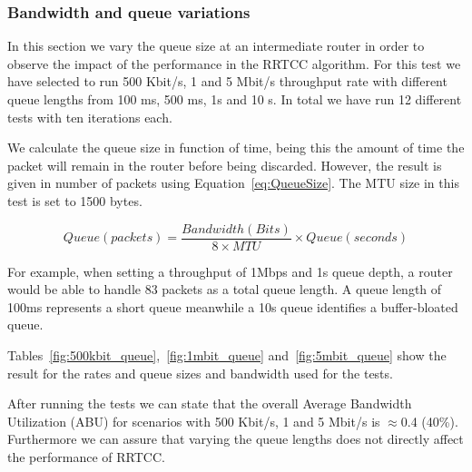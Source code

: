 \subsubsection{Bandwidth and queue variations}

In this section we vary the queue size at an intermediate router in order to observe the impact of the performance in the RRTCC algorithm. For this test we have selected to run 500 Kbit/s, 1 and 5 Mbit/s throughput rate with different queue lengths from 100 ms, 500 ms, 1s and 10 s. In total we have run 12 different tests with ten iterations each.

We calculate the queue size in function of time, being this the amount of time the packet will remain in the router before being discarded. However, the result is given in number of packets using Equation~\ref{eq:QueueSize}. The MTU size in this test is set to 1500 bytes.

\begin{equation}
	Queue (packets) = \frac{Bandwidth (Bits)}{8 \times MTU} \times Queue (seconds)
	\label{eq:QueueSize}
\end{equation}

For example, when setting a throughput of 1Mbps and 1s queue depth, a router would be able to handle 83 packets as a total queue length. A queue length of 100ms represents a short queue meanwhile a 10s queue identifies a buffer-bloated queue. 

Tables~\ref{fig:500kbit_queue},~\ref{fig:1mbit_queue} and~\ref{fig:5mbit_queue} show the result for the rates and queue sizes and bandwidth used for the tests.

After running the tests we can state that the overall Average Bandwidth Utilization (ABU)  for scenarios with 500 Kbit/s, 1 and 5 Mbit/s is $\approx$0.4 (40\%). Furthermore we can assure that varying the queue lengths does not directly affect the performance of RRTCC.

